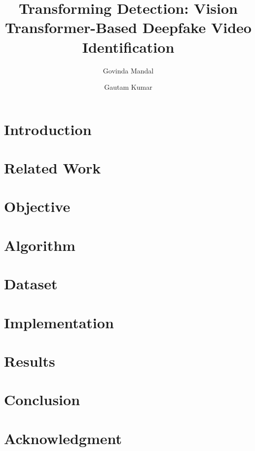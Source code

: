 \documentclass[runningheads]{llncs}
\begin{document}
\title{Transforming Detection: Vision Transformer-Based Deepfake Video Identification}

\author{Govinda Mandal \and Gautam Kumar}


\maketitle

\begin{abstract}

\end{abstract}


\section{Introduction}


\section{Related Work}


\section{Objective}


\section{Algorithm}


\section{Dataset}


\section{Implementation}


\section{Results}


\section{Conclusion}


\section*{Acknowledgment}


\printbibliography
\end{document}
